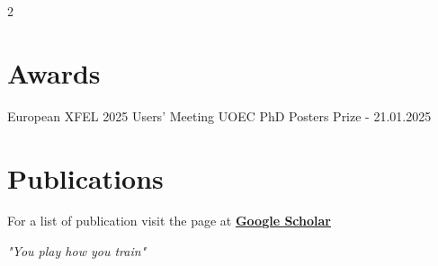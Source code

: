 \documentclass[lighthipster]{simplehipstercv}
\begin{document}
\begin{paracol}{2}
\begin{minipage}[t]{0.3\textwidth}
    \section*{Awards} %
    {\small European XFEL 2025 Users' Meeting UOEC PhD Posters Prize - 21.01.2025}

    \section*{Publications}
    For a list of publication visit the page at \href{https://scholar.google.com/citations?user=GPGZ9PQAAAAJ&hl=en}{\textbf{Google Scholar}}
\end{minipage}

\vfill

\begin{center}
   \emph{"You play how you train"}
\end{center}

\newpage
\end{paracol}
\end{document}
